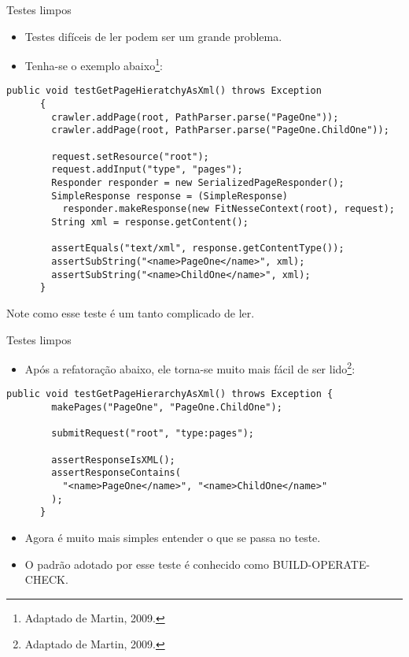 \documentclass[11pt]{beamer}
\begin{document}
  \begin{frame}[fragile]{Testes limpos}
    \begin{itemize}
      \item Testes difíceis de ler podem ser um grande problema.
      \item Tenha-se o exemplo abaixo\footnote{Adaptado de Martin, 2009.}:
    \end{itemize}
    \begin{lstlisting}[basicstyle=\tiny]
      public void testGetPageHieratchyAsXml() throws Exception
      {
        crawler.addPage(root, PathParser.parse("PageOne"));
        crawler.addPage(root, PathParser.parse("PageOne.ChildOne"));

        request.setResource("root");
        request.addInput("type", "pages");
        Responder responder = new SerializedPageResponder();
        SimpleResponse response = (SimpleResponse)
          responder.makeResponse(new FitNesseContext(root), request);
        String xml = response.getContent();

        assertEquals("text/xml", response.getContentType());
        assertSubString("<name>PageOne</name>", xml);
        assertSubString("<name>ChildOne</name>", xml);
      }
    \end{lstlisting}
    Note como esse teste é um tanto complicado de ler.
  \end{frame}

  \begin{frame}[fragile]{Testes limpos}
    \begin{itemize}
      \item Após a refatoração abaixo, ele torna-se muito mais fácil de ser lido\footnote{Adaptado de Martin, 2009.}:
    \end{itemize}
    \begin{lstlisting}[basicstyle=\tiny]
      public void testGetPageHierarchyAsXml() throws Exception {
        makePages("PageOne", "PageOne.ChildOne");

        submitRequest("root", "type:pages");

        assertResponseIsXML();
        assertResponseContains(
          "<name>PageOne</name>", "<name>ChildOne</name>"
        );
      }
    \end{lstlisting}
    \begin{itemize}
      \item Agora é muito mais simples entender o que se passa no teste.
      \item O padrão adotado por esse teste é conhecido como BUILD-OPERATE-CHECK. 
    \end{itemize}
  \end{frame}
\end{document}
